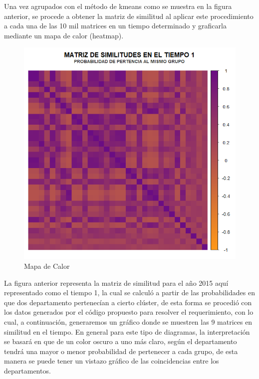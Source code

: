 \documentclass[12pt]{article}
\begin{document}
Una vez agrupados con el método de kmeans como se muestra en la figura anterior, se procede a obtener la matriz de similitud al aplicar este procedimiento a cada una de las 10 mil matrices en un tiempo determinado y graficarla mediante un mapa de calor (heatmap).


\begin{figure}[H]
    \centering
    \includegraphics[width=0.7\linewidth]{Imagenes/Mapa-Calor.png}
    \caption{Mapa de Calor}
    \label{fig_enter_label}
\end{figure}

La figura anterior representa la matriz de similitud para el año 2015 aquí representado como el tiempo 1, la cual se calculó a partir de las probabilidades en que dos departamento pertenecían a cierto clúster, de esta forma  se procedió con los datos generados por el código propuesto para resolver el requerimiento, con lo cual, a continuación, generaremos un gráfico donde se muestren las 9 matrices en similitud en el tiempo.
En general para este tipo de diagramas, la interpretación se basará en que de un color oscuro a uno más claro, según el departamento tendrá una mayor o menor probabilidad de pertenecer a cada grupo, de esta manera se puede tener un vistazo gráfico de las coincidencias entre los departamentos.

\newpage
\end{document}
